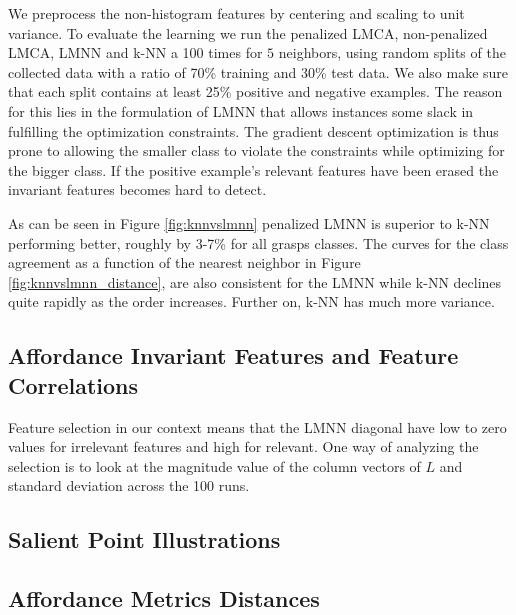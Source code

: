 We preprocess the non-histogram features by centering and scaling to
unit variance. To evaluate the learning we run the penalized LMCA,
non-penalized LMCA, LMNN and k-NN a 100 times for \(5\) neighbors, using
random splits of the collected data with a ratio of 70\% training and
30\% test data. We also make sure that each split contains at least 25\%
positive and negative examples. The reason for this lies in the
formulation of LMNN that allows instances some slack in fulfilling the
optimization constraints. The gradient descent optimization is thus
prone to allowing the smaller class to violate the constraints while
optimizing for the bigger class. If the positive example's relevant
features have been erased the invariant features becomes hard to detect.

As can be seen in Figure \ref{fig:knnvslmnn} penalized LMNN is superior
to k-NN performing better, roughly by 3-7\% for all grasps classes. The
curves for the class agreement as a function of the nearest neighbor in
Figure \ref{fig:knnvslmnn_distance}, are also consistent for the LMNN
while k-NN declines quite rapidly as the order increases. Further on,
k-NN has much more variance.

\subsection{Affordance Invariant Features and Feature
Correlations}\label{affordance-invariant-features-and-feature-correlations}

Feature selection in our context means that the LMNN diagonal have low
to zero values for irrelevant features and high for relevant. One way of
analyzing the selection is to look at the magnitude value of the column
vectors of \(L\) and standard deviation across the 100 runs.

\subsection{Salient Point
Illustrations}\label{salient-point-illustrations}

\subsection{Affordance Metrics
Distances}\label{affordance-metrics-distances}
